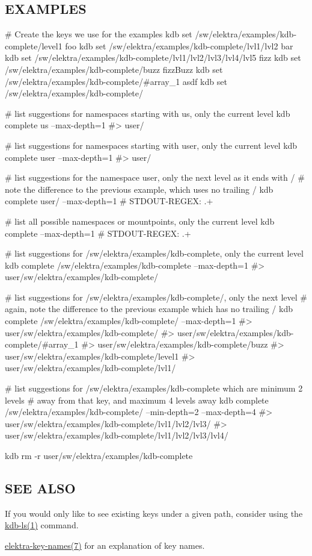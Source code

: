 \subsection*{E\+X\+A\+M\+P\+L\+ES}


\begin{DoxyCode}
# Create the keys we use for the examples
kdb set /sw/elektra/examples/kdb-complete/level1 foo
kdb set /sw/elektra/examples/kdb-complete/lvl1/lvl2 bar
kdb set /sw/elektra/examples/kdb-complete/lvl1/lvl2/lvl3/lvl4/lvl5 fizz
kdb set /sw/elektra/examples/kdb-complete/buzz fizzBuzz
kdb set /sw/elektra/examples/kdb-complete/#array\_1 asdf
kdb set /sw/elektra/examples/kdb-complete/%

# list suggestions for namespaces starting with us, only the current level
kdb complete us --max-depth=1
#> user/

# list suggestions for namespaces starting with user, only the current level
kdb complete user --max-depth=1
#> user/

# list suggestions for the namespace user, only the next level as it ends with /
# note the difference to the previous example, which uses no trailing /
kdb complete user/ --max-depth=1
# STDOUT-REGEX: .+

# list all possible namespaces or mountpoints, only the current level
kdb complete --max-depth=1
# STDOUT-REGEX: .+

# list suggestions for /sw/elektra/examples/kdb-complete, only the current level
kdb complete /sw/elektra/examples/kdb-complete --max-depth=1
#> user/sw/elektra/examples/kdb-complete/

# list suggestions for /sw/elektra/examples/kdb-complete/, only the next level
# again, note the difference to the previous example which has no trailing /
kdb complete /sw/elektra/examples/kdb-complete/ --max-depth=1
#> user/sw/elektra/examples/kdb-complete/%
#> user/sw/elektra/examples/kdb-complete/#array\_1
#> user/sw/elektra/examples/kdb-complete/buzz
#> user/sw/elektra/examples/kdb-complete/level1
#> user/sw/elektra/examples/kdb-complete/lvl1/

# list suggestions for /sw/elektra/examples/kdb-complete which are minimum 2 levels
# away from that key, and maximum 4 levels away
kdb complete /sw/elektra/examples/kdb-complete/ --min-depth=2 --max-depth=4
#> user/sw/elektra/examples/kdb-complete/lvl1/lvl2/lvl3/
#> user/sw/elektra/examples/kdb-complete/lvl1/lvl2/lvl3/lvl4/

kdb rm -r user/sw/elektra/examples/kdb-complete
\end{DoxyCode}


\subsection*{S\+EE A\+L\+SO}


\begin{DoxyItemize}
\item If you would only like to see existing keys under a given path, consider using the \hyperlink{md_doc_help_kdb-ls_doc_help_kdb-ls_md}{kdb-\/ls(1)} command.
\item \hyperlink{md_doc_help_elektra-key-names_doc_help_elektra-key-names_md}{elektra-\/key-\/names(7)} for an explanation of key names. 
\end{DoxyItemize}